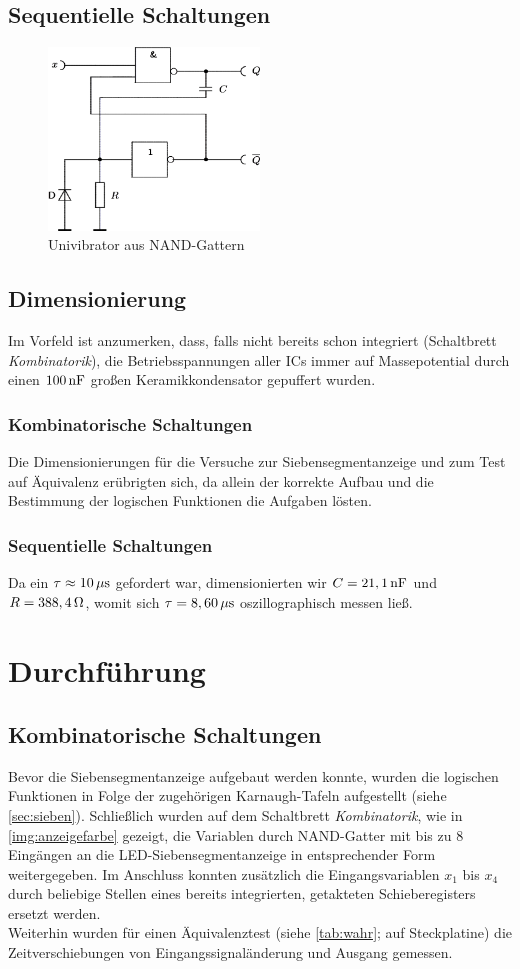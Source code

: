 \documentclass[numbers=noenddot,12pt,a4paper]{scrartcl}
\begin{document}
\subsection{Sequentielle Schaltungen}
\begin{figure}[H]
\centering
\includegraphics[width=0.5\textwidth]{univibrator.png}
\caption{Univibrator aus NAND-Gattern} \label{img:uni}
\end{figure}
\subsection{Dimensionierung}
Im Vorfeld ist anzumerken, dass, falls nicht bereits schon integriert (Schaltbrett \textit{Kombinatorik}), die Betriebsspannungen aller ICs immer auf Massepotential durch einen $\unit[100]{nF}$ großen Keramikkondensator gepuffert wurden.
\subsubsection{Kombinatorische Schaltungen}
Die Dimensionierungen für die Versuche zur Siebensegmentanzeige und zum Test auf Äquivalenz erübrigten sich, da allein der korrekte Aufbau und die Bestimmung der logischen Funktionen die Aufgaben lösten.
\subsubsection{Sequentielle Schaltungen}
Da ein $\tau\approx\unit[10]{\mu s}$ gefordert war, dimensionierten wir $C=\unit[21,1]{nF}$ und $R=\unit[388,4]{\Omega}$, womit sich $\tau=\unit[8,60]{\mu s}$ oszillographisch messen ließ.
\section{Durchführung}
\subsection{Kombinatorische Schaltungen}
Bevor die Siebensegmentanzeige aufgebaut werden konnte, wurden die logischen Funktionen in Folge der zugehörigen Karnaugh-Tafeln aufgestellt (siehe \ref{sec:sieben}). Schließlich wurden auf dem Schaltbrett \textit{Kombinatorik}, wie in \ref{img:anzeigefarbe} gezeigt, die Variablen durch NAND-Gatter mit bis zu 8 Eingängen an die LED-Siebensegmentanzeige in entsprechender Form weitergegeben. Im Anschluss konnten zusätzlich die Eingangsvariablen $x_1$ bis $x_4$ durch beliebige Stellen eines bereits integrierten, getakteten Schieberegisters ersetzt werden. \\
Weiterhin wurden für einen Äquivalenztest (siehe \ref{tab:wahr}; auf Steckplatine) die Zeitverschiebungen von Eingangssignaländerung und Ausgang gemessen.
\end{document}
